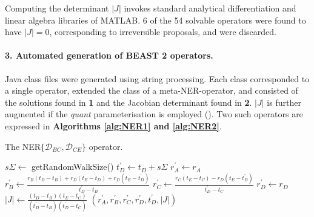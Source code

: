 \documentclass[10pt,letterpaper]{article}
\begin{document}
Computing the determinant $|J|$ invokes standard analytical differentiation and linear algebra libraries of MATLAB. 
6 of the 54 solvable operators were found to have $|J|=0$, corresponding to irreversible proposals, and were discarded. 


\paragraph{3. Automated generation of BEAST 2 operators.} Java class files were generated using string processing. 
Each class corresponded to a single operator, extended the class of a meta-NER-operator, and consisted of the solutions found in \textbf{1} and the Jacobian determinant found in \textbf{2}. 
$|J|$ is further augmented if the \textit{quant} parameterisation is employed (\textbf{}).
Two such operators are expressed in \textbf{Algorithms \ref{alg:NER1} and \ref{alg:NER2}}.



\begin{algorithm}
\caption{The NER$\{ \mathcal{D}_{BC}, \mathcal{D}_{CE} \}$ operator.}
\begin{algorithmic}[1]


	\State
    \State $s\Sigma \leftarrow $ getRandomWalkSize() 
    \State $t_D^\prime \leftarrow t_D + s\Sigma$ 
    \State
    \State $r_A^\prime \leftarrow r_A$ 
    \State $r_B^\prime \leftarrow \frac{r_B(t_D - t_B) + r_D(t_E - t_D) + r_D(t_E - t_D^\prime)}{t_D^\prime - t_B}$
    \State $r_C^\prime \leftarrow \frac{r_C(t_E - t_C) - r_D(t_E - t_D^\prime)}{t_D^\prime - t_C}$
    \State $r_D^\prime \leftarrow r_D$
    \State
    \State $|J| \leftarrow \frac{(t_D - t_B)(t_E - t_C)}{(t_D^\prime - t_B)(t_D^\prime - t_C)}$ 
    \State \Return $(r_A^\prime, r_B^\prime, r_C^\prime, r_D^\prime, t_D^\prime, |J|)$
    
\EndProcedure

\end{algorithmic}
\label{alg:NER1}
\end{algorithm}
\end{document}

